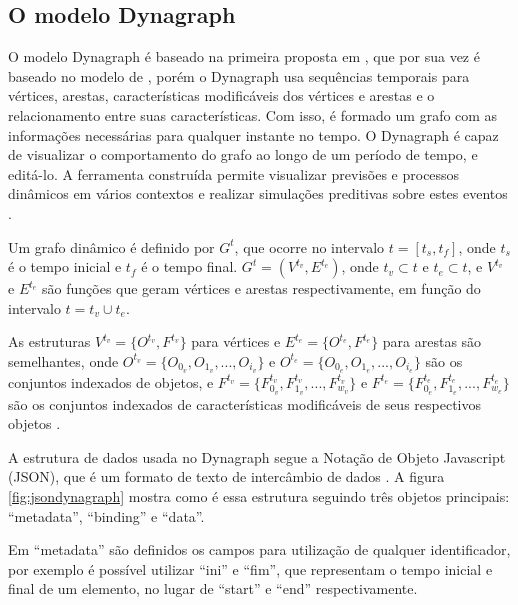 \pagebreak

\subsection{O modelo Dynagraph}
O modelo Dynagraph \cite{dynagraph} é baseado na primeira proposta em \cite{dynagraph2012}, que por sua vez é baseado no modelo
de \cite{kim}, porém o Dynagraph usa sequências temporais para vértices, arestas, características modificáveis dos vértices e arestas e
o relacionamento entre suas características. Com isso, é formado um grafo com as informações necessárias para qualquer instante no tempo.
O Dynagraph é capaz de visualizar o comportamento do grafo ao longo de um período de tempo, e editá-lo. A ferramenta construída permite
visualizar previsões e processos dinâmicos em vários contextos e realizar simulações preditivas sobre estes eventos \cite{dynagraph}.

Um grafo dinâmico é definido por $G^t$, que ocorre no intervalo $t = [t_s,t_f]$, onde $t_s$ é o tempo inicial e $t_f$ é o tempo final.
$G^t = (V^{t_v}, E^{t_e})$, onde $t_v \subset t$ e $t_e \subset t$, e $V^{t_v}$ e $E^{t_e}$ são funções que geram vértices e arestas
respectivamente, em função do intervalo $t=t_v \cup t_e$.

As estruturas $V^{t_v} = \{O^{t_v}, F^{t_v}\}$ para vértices e $E^{t_e} = \{O^{t_e}, F^{t_e}\}$ para arestas são semelhantes,
onde $O^{t_v} = \{O_{0_v}, O_{1_v},..., O_{i_v}\}$ e $O^{t_e} = \{O_{0_e}, O_{1_e},..., O_{i_e}\}$ são os conjuntos indexados de objetos,
e $F^{t_v} = \{F^{t_v}_{0_v}, F^{t_v}_{1_v},..., F^{t_v}_{w_v}\}$ e $F^{t_e} = \{F^{t_e}_{0_e}, F^{t_e}_{1_e},..., F^{t_e}_{w_e}\}$ são os
conjuntos indexados de características modificáveis de seus respectivos objetos \cite{dynagraph}.

A estrutura de dados usada no Dynagraph segue a Notação de Objeto Javascript (JSON), que é um formato de texto de intercâmbio de dados \cite{douglas}.
A figura \ref{fig:jsondynagraph} mostra como é essa estrutura seguindo três objetos principais: ``metadata'', ``binding'' e ``data''.

Em ``metadata'' são definidos os campos para utilização de qualquer identificador, por exemplo é possível utilizar ``ini'' e ``fim'',
que representam o tempo inicial e final de um elemento, no lugar de ``start'' e ``end'' respectivamente.

